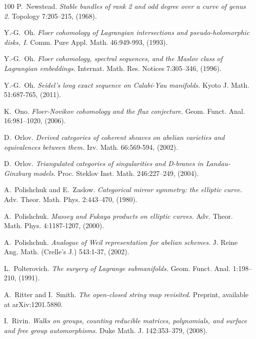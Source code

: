 \begin{thebibliography}{100}
P.~Newstead.
\emph{Stable bundles of rank 2 and odd degree over a curve of genus 2.}
Topology 7:205--215, (1968).

Y.-G.~Oh.
\emph{Floer cohomology of Lagrangian intersections and pseudo-holomorphic disks, I.}
Comm. Pure Appl. Math. 46:949-993, (1993).

Y.-G.~Oh.
\emph{Floer cohomology, spectral sequences, and the Maslov class of Lagrangian embeddings.}
Internat. Math. Res. Notices 7:305--346, (1996).

Y.-G.~Oh.
\emph{Seidel's long exact sequence on Calabi-Yau manifolds.}
Kyoto J. Math. 51:687-765, (2011).

K.~Ono.
\emph{Floer-Novikov cohomology and the flux conjecture.}
Geom. Funct. Anal. 16:981--1020, (2006).

D.~Orlov.
\emph{Derived categories of coherent sheaves on abelian varieties and equivalences between them.}
Izv. Math. 66:569-594, (2002).

D.~Orlov.
\emph{Triangulated categories of singularities and D-branes in Landau-Ginzburg models.}
Proc. Steklov Inst. Math. 246:227--249, (2004).

A.~Polishchuk and E.~Zaslow.
\emph{Categorical mirror symmetry: the elliptic curve.}
Adv. Theor. Math. Phys. 2:443--470, (1980).

A.~Polishchuk.
\emph{Massey and Fukaya products on elliptic curves.}
Adv. Theor. Math. Phys. 4:1187-1207, (2000).

A.~Polishchuk.
\emph{Analogue of Weil representation for abelian schemes.}
J. Reine Ang. Math. (Crelle's J.) 543:1-37, (2002).

L.~Polterovich.
\emph{The surgery of Lagrange submanifolds.}
 Geom. Funct. Anal. 1:198--210, (1991).


A.~Ritter and I.~Smith.
\emph{The open-closed string map revisited.}
Preprint, available at arXiv:1201.5880.

I.~Rivin.
\emph{Walks on groups, counting reducible matrices, polynomials, and surface and free group automorphisms.}
Duke Math. J. 142:353--379, (2008).


\end{thebibliography}
